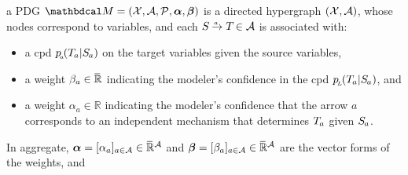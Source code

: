 \documentclass[twoside]{article}
\begin{document}
\begin{defn}
    a PDG $\dg M = (\X, \Ar, \mathcal P, \balpha, \bbeta )
    $
    is a directed hypergraph  $(\mathcal X, \mathcal A)$, whose nodes correspond to variables, and
    each 
    $\ed a{\Src {}}{\Tgt {}} \in \Ar$
    is associated with:
    \begin{itemize}[itemsep=0pt]
        \item a cpd $p\ssub a (\Tgt a | \Src a)$ on the target variables given the source variables,
        \item a weight $\beta_a \in \mskip1mu\overline{\mskip-1mu\mathbb R\!}\,$ indicating 
            the modeler's confidence in the cpd $p\ssub L(\Tgt a | \Src a)$, and 
        \item a weight $\alpha_a \in \mathbb R$ indicating 
            the modeler's confidence that the arrow $a$ corresponds to an independent mechanism that determines $\Tgt a$ given $\Src a$. 
    \end{itemize}
    In aggregate, $\boldsymbol\alpha = [\alpha_a]_{a \in \mathcal A} \in \mskip1mu\overline{\mskip-1mu\mathbb R\!}\,^\mathcal A$ and $\boldsymbol\beta = [\beta_a]_{a \in \mathcal A} \in \mskip1mu\overline{\mskip-1mu\mathbb R\!}\,^\mathcal A$ are the vector forms of the weights, and 
\end{defn}
\end{document}
